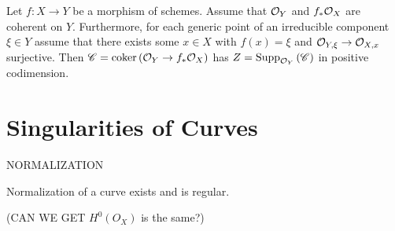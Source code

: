 \documentclass[12pt]{article}
\begin{document}
\begin{lemma}
Let $f : X \to Y$ be a morphism of schemes. Assume that $\mathcal{O}_{Y}$ and $f_* \mathcal{O}_{X}$ are coherent on $Y$. Furthermore, for each generic point of an irreducible component $\xi \in Y$ assume that there exists some $x \in X$ with $f(x) = \xi$ and $\mathcal{O}_{Y, \xi} \to \mathcal{O}_{X, x}$ surjective. Then $\mathscr{C} = \operatorname{\mathrm{coker}}{(\mathcal{O}_{Y} \to f_* \mathcal{O}_{X})}$ has $Z = \mathrm{Supp}_{\mathcal{O}_{Y}}\left(\mathscr{C} \right)$ in positive codimension.
\end{lemma}




\section{Singularities of Curves}


\begin{defn}
NORMALIZATION
\end{defn}

\begin{prop}
Normalization of a curve exists and is regular. 
\end{prop}

(CAN WE GET $H^0(O_X)$ is the same?)
\end{document}
